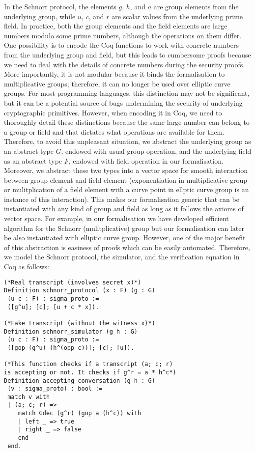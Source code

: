 \documentclass[conference,compsoc]{IEEEtran}
\begin{document}
In the Schnorr protocol, the elements $g$, $h$, and $a$ are group elements from the underlying group, while $u$, $c$, and $r$
are scalar values from the underlying prime field. In practice, both the group elements and the field elements are large 
numbers modulo some prime numbers, although the operations on them differ. 
One possibility is to encode the Coq functions to work with concrete numbers from the underlying group and field, 
but this leads to cumbersome proofs because we need to deal with the details of concrete numbers during the security proofs. 
More importantly, it is not modular because it binds the formalisation to multiplicative groups; therefore, 
it can no longer be used over elliptic curve groups. For most programming languages, this distinction 
may not be significant, but it can be a potential source of bugs \cite{10.1007/978-3-662-63958-0_24} undermining 
the security of underlying cryptographic primitives. 
However, when encoding it in Coq, we need to thoroughly detail these distinctions because 
the same large number can belong to a group or field and that dictates what operations are available for them. 
Therefore, to avoid this unpleasant situation,  
we abstract the underlying group as an abstract type $G$, endowed with 
usual group operation, and the underlying field as an abstract type $F$, endowed with 
field operation in our formalisation. 
Moreover, we abstract these two types into a vector space for smooth interaction between 
group element and field element (exponentiation in multiplicative group or mulitplication of a field element 
with a curve point in ellptic curve group is an instance of this interaction). This 
makes our formalisation generic that can be instantiated with 
any kind of group and field as long as it follows the axioms of 
vector space. For example, in our formalisation we have developed 
efficient algorithm for the Schnorr (mulitplicative) group but our formalisation can 
later be also instantiated with elliptic curve group. However, 
one of the major benefit of this abstraction is easiness of proofs 
which can be easily automated. Therefore, we model the Schnorr 
protocol, the simulator, and the verification equation in Coq as follows: 
 
\begin{lstlisting}[frame=single, language=Coq, caption={Schnorr protocol},
  label={ind_nat},captionpos=t, basicstyle=\ttfamily\footnotesize,
  abovecaptionskip=-\medskipamount]
(*Real transcript (involves secret x)*)
Definition schnorr_protocol (x : F) (g : G) 
 (u c : F) : sigma_proto :=  
 ([g^u]; [c]; [u + c * x]).

(*Fake transcript (without the witness x)*)
Definition schnorr_simulator (g h : G) 
 (u c : F) : sigma_proto := 
 ([gop (g^u) (h^(opp c))]; [c]; [u]).

(*This function checks if a transcript (a; c; r) 
is accepting or not. It checks if g^r = a * h^c*)
Definition accepting_conversation (g h : G) 
 (v : sigma_proto) : bool :=
 match v with
 | (a; c; r) =>  
    match Gdec (g^r) (gop a (h^c)) with 
    | left _ => true
    | right _ => false 
    end
 end.
\end{lstlisting}
  
\end{document}
